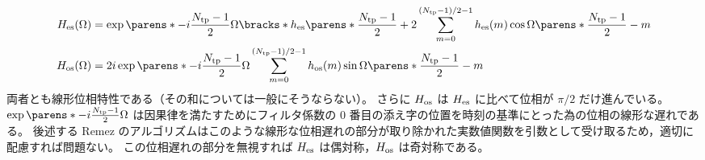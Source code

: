                 \begin{align*}
                    \Hes(\Omega) &= \exp\parens*{-i\frac{\Ntp-1}{2}\Omega}\bracks*{\hes\parens*{\frac{\Ntp-1}{2}} + 2\sum_{m=0}^{(\Ntp-1)/2-1}{\hes(m)\cos\Omega\parens*{\frac{\Ntp-1}{2}-m}}} \\
                    \Hos(\Omega) &= 2i\exp\parens*{-i\frac{\Ntp-1}{2}\Omega}\sum_{m=0}^{(\Ntp-1)/2-1}{\hos(m)\sin\Omega\parens*{\frac{\Ntp-1}{2}-m}}
                \end{align*}
                両者とも線形位相特性である（その和については一般にそうならない）。
                さらに $H_{\text{os}}$ は $H_{\text{es}}$ に比べて位相が $\pi/2$ だけ進んでいる。
                $\exp\parens*{-i\frac{\Ntp-1}{2}\Omega}$ は因果律を満たすためにフィルタ係数の 0 番目の添え字の位置を時刻の基準にとった為の位相の線形な遅れである。
                後述する Remez のアルゴリズムはこのような線形な位相遅れの部分が取り除かれた実数値関数を引数として受け取るため，適切に配慮すれば問題ない。
                この位相遅れの部分を無視すれば $H_{\text{es}}$ は偶対称，$H_{\text{os}}$ は奇対称である。
